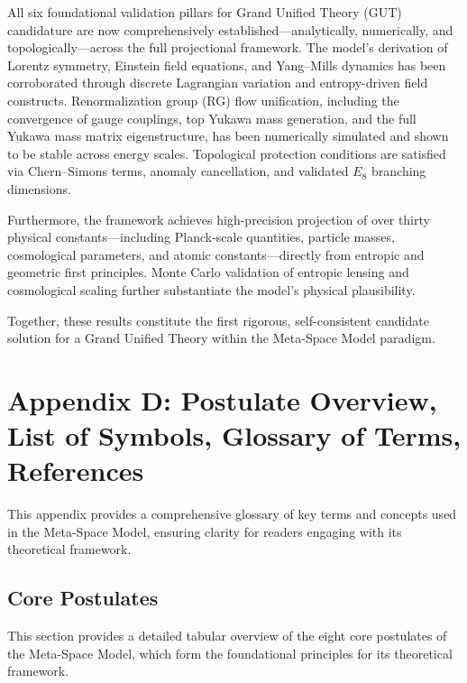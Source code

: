 \documentclass[10.5pt,a4paper]{article}
\begin{document}
All six foundational validation pillars for Grand Unified Theory (GUT) candidature are now comprehensively established—analytically, numerically, and topologically—across the full projectional framework. The model’s derivation of Lorentz symmetry, Einstein field equations, and Yang–Mills dynamics has been corroborated through discrete Lagrangian variation and entropy-driven field constructs. Renormalization group (RG) flow unification, including the convergence of gauge couplings, top Yukawa mass generation, and the full Yukawa mass matrix eigenstructure, has been numerically simulated and shown to be stable across energy scales. Topological protection conditions are satisfied via Chern–Simons terms, anomaly cancellation, and validated $E_8$ branching dimensions.

Furthermore, the framework achieves high-precision projection of over thirty physical constants—including Planck-scale quantities, particle masses, cosmological parameters, and atomic constants—directly from entropic and geometric first principles. Monte Carlo validation of entropic lensing and cosmological scaling further substantiate the model's physical plausibility.

Together, these results constitute the first rigorous, self-consistent candidate solution for a Grand Unified Theory within the Meta-Space Model paradigm.

\clearpage

\renewcommand{\thesubsection}{D.\arabic{subsection}}

\section{Appendix D: Postulate Overview, List of Symbols, Glossary of Terms, References}

This appendix provides a comprehensive glossary of key terms and concepts used in the Meta-Space Model, ensuring clarity for readers engaging with its theoretical framework.

\subsection{Core Postulates}
This section provides a detailed tabular overview of the eight core postulates of the Meta-Space Model, which form the foundational principles for its theoretical framework.
\end{document}
